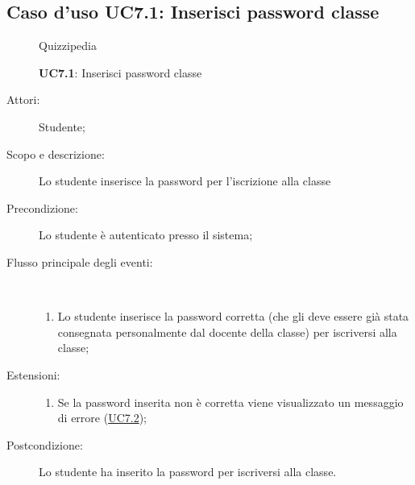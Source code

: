 \subsection{Caso d'uso UC7.1: Inserisci password classe}
\begin{figure}[H]
	\centering
	\begin{resizedtikzpicture}{\textwidth}
		\begin{umlsystem}[x=0, fill=lightgray!20]{Quizzipedia}
		\end{umlsystem}
	\end{resizedtikzpicture}
	\caption{\textbf{UC7.1}: Inserisci password classe}
	\label{UC7.1}
\end{figure}
\begin{description}
	\item[Attori:] Studente;
	\item[Scopo e descrizione:] Lo studente inserisce la password per l'iscrizione alla classe
	\item[Precondizione:] Lo studente è autenticato presso il sistema;
	
	\item[Flusso principale degli eventi:] \ 
	\begin{enumerate}
		\item Lo studente inserisce la password corretta (che gli deve essere già stata consegnata personalmente dal docente della classe) per iscriversi alla classe;
		
	\end{enumerate}
	\item[Estensioni:]
	\begin{enumerate}
		\item Se la password inserita non è corretta viene visualizzato un messaggio di errore (\hyperlink{UC7.2}{UC7.2});
		
	\end{enumerate}
	\item[Postcondizione:] Lo studente ha inserito la password per iscriversi alla classe.
\end{description}
\hypertarget{UC7.2}{}
